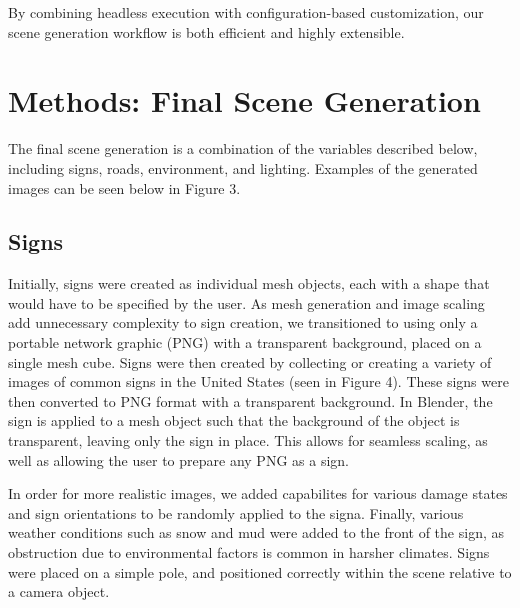 \documentclass[journal]{IEEEtran}
\begin{document}
 By combining headless execution with configuration-based customization, our scene generation workflow is both efficient and highly extensible.

 \section{Methods: Final Scene Generation}

 The final scene generation is a combination of the variables described below, including signs, roads, environment, and lighting. Examples of the generated images can be seen below in Figure 3.
 
\subsection{Signs}
Initially, signs were created as individual mesh objects, each with a shape that would have to be specified by the user. As mesh generation and image scaling add unnecessary complexity to sign creation, we transitioned to using only a portable network graphic (PNG) with a transparent background, placed on a single mesh cube. Signs were then created by collecting  or creating a variety of images of common signs in the United States (seen in Figure 4). These signs were then converted to PNG format with a transparent background. In Blender, the sign is applied to a mesh object such that the background of the object is transparent, leaving only the sign in place. This allows for seamless scaling, as well as allowing the user to prepare any PNG as a sign.

In order for more realistic images, we added capabilites for various damage states and sign orientations to be randomly applied to the signa. Finally, various weather conditions such as snow and mud were added to the front of the sign, as obstruction due to environmental factors is common in harsher climates. Signs were placed on a simple pole, and positioned correctly within the scene relative to a camera object. 
\end{document}
